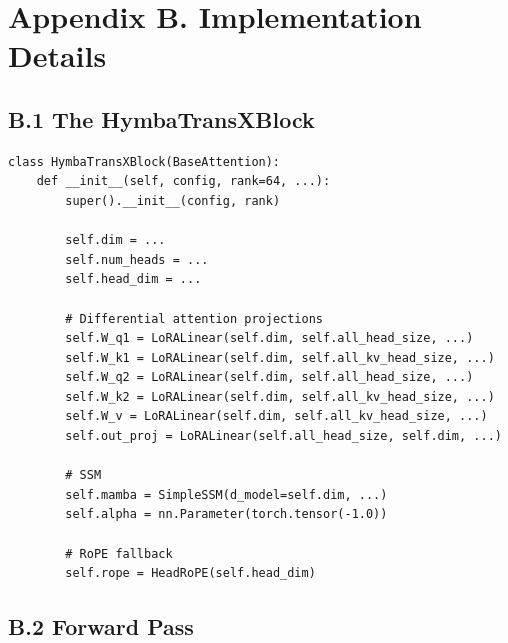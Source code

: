 \section{Appendix B. Implementation Details}

\subsection{B.1 The HymbaTransXBlock}

\begin{lstlisting}
class HymbaTransXBlock(BaseAttention):
    def __init__(self, config, rank=64, ...):
        super().__init__(config, rank)
        
        self.dim = ...
        self.num_heads = ...
        self.head_dim = ...
        
        # Differential attention projections
        self.W_q1 = LoRALinear(self.dim, self.all_head_size, ...)
        self.W_k1 = LoRALinear(self.dim, self.all_kv_head_size, ...)
        self.W_q2 = LoRALinear(self.dim, self.all_head_size, ...)
        self.W_k2 = LoRALinear(self.dim, self.all_kv_head_size, ...)
        self.W_v = LoRALinear(self.dim, self.all_kv_head_size, ...)
        self.out_proj = LoRALinear(self.all_head_size, self.dim, ...)
        
        # SSM
        self.mamba = SimpleSSM(d_model=self.dim, ...)
        self.alpha = nn.Parameter(torch.tensor(-1.0))
        
        # RoPE fallback
        self.rope = HeadRoPE(self.head_dim)
\end{lstlisting}

\subsection{B.2 Forward Pass}

